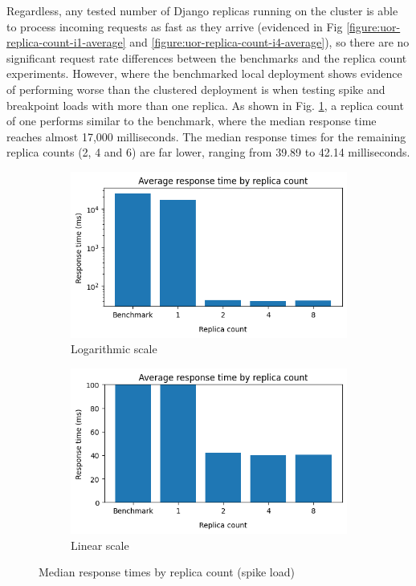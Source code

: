 Regardless, any tested number of Django replicas running on the cluster is able to process incoming requests as fast as they arrive (evidenced in Fig \ref{figure:uor-replica-count-i1-average} and \ref{figure:uor-replica-count-i4-average}), so there are no significant request rate differences between the benchmarks and the replica count experiments. However, where the benchmarked local deployment shows evidence of performing worse than the clustered deployment is when testing spike and breakpoint loads with more than one replica. As shown in Fig. \ref{figure:uor-replica-count-rt-comp-spike}, a replica count of one performs similar to the benchmark, where the median response time reaches almost 17,000 milliseconds. The median response times for the remaining replica counts (2, 4 and 6) are far lower, ranging from 39.89 to 42.14 milliseconds.

\begin{figure}[h]
    \centering
    \begin{subfigure}{.5\textwidth}
      \centering
      \includegraphics[width=\linewidth]{figures/uor-replica-count-rt-comp-spike1.png}
      \caption{Logarithmic scale}
    \end{subfigure}%
    \begin{subfigure}{.5\textwidth}
      \centering
      \includegraphics[width=\linewidth]{figures/uor-replica-count-rt-comp-spike2.png}
      \caption{Linear scale}
    \end{subfigure}

    \caption{Median response times by replica count (spike load)}
    \label{figure:uor-replica-count-rt-comp-spike}
\end{figure}

